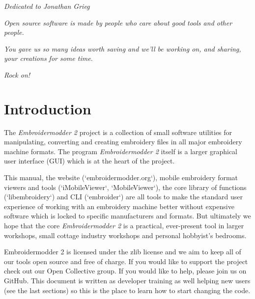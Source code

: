 \documentclass[10pt]{report}
\begin{document}
\newpage

\vspace*{8cm}

\begin{center}
    \emph{Dedicated to Jonathan Grieg}
    
    \vspace{1cm}
    
    \emph{Open source software is made by people who care about good tools
     and other people.}
    
    \vspace{1cm}
    
    \emph{You gave us so many ideas worth saving and we'll be working on,
    and sharing, your creations for some time.}
    
    \vspace{1cm}
    
    \emph{Rock on!}
\end{center}
    
\newpage

\tableofcontents

\chapter{Introduction}

The \emph{Embroidermodder 2} project is a collection of small software utilities for
manipulating, converting and creating embroidery files in all major embroidery
machine formats. The program \textit{Embroidermodder 2} itself is a larger graphical
user interface (GUI) which is at the heart of the project.

This manual, the website (`embroidermodder.org`), mobile embroidery format viewers
and tools (`iMobileViewer`, `MobileViewer`), the core library of functions
(`libembroidery`) and CLI (`embroider`) are all tools to make the standard
user experience of working with an embroidery machine better without expensive
software which is locked to specific manufacturers and formats. But ultimately
we hope that the core \textit{Embroidermodder 2} is a practical, ever-present tool in
larger workshops, small cottage industry workshops and personal hobbyist's
bedrooms.

Embroidermodder 2 is licensed under the zlib license and we aim to keep all of
our tools open source and free of charge. If you would like to support the
project check out our Open Collective group. If you would like to help, please
join us on GitHub. This document is written as developer training as well
helping new users (see the last sections) so this is the place to learn how
to start changing the code.
\end{document}
